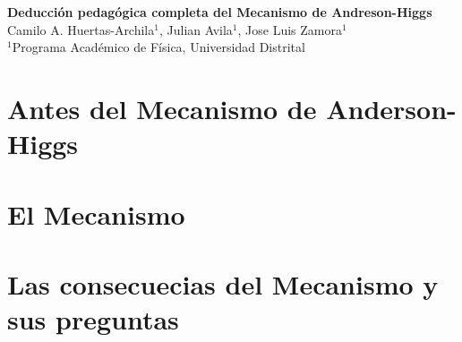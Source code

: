 \documentclass[12pt,a4paper]{article}
\begin{document}
\begin{center}
    \textbf{\Large Deducción pedagógica completa del Mecanismo de Andreson-Higgs}\\[1em]
    \normalsize
	Camilo A. Huertas-Archila$^{1}$, Julian Avila$^{1}$, Jose Luis Zamora$^{1}$\\[0.5em]
    $^{1}$Programa Académico de Física, Universidad Distrital\\[1em]
\end{center}

\vspace{1em}



\section{Antes del Mecanismo de Anderson-Higgs}

\section{El Mecanismo}

\section{Las consecuecias del Mecanismo y sus preguntas}


\nocite{*}


\end{document}

